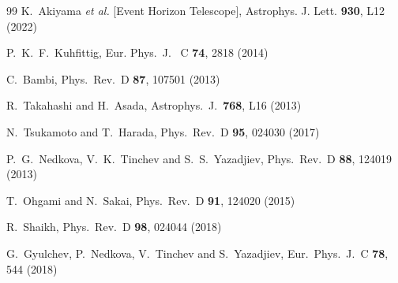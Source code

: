 \documentclass[aps,prd,12pt,superscriptaddress]{revtex4-2}
\begin{document}
\begin{thebibliography}{99}
K.~Akiyama \textit{et al.} [Event Horizon Telescope],
Astrophys. J. Lett. \textbf{930}, L12 (2022)


  P.~K.~F.~Kuhfittig,
  Eur. Phys.\ J. \ C {\bf 74}, 2818 (2014)
 
  C.~Bambi,
  Phys.\ Rev.\ D {\bf 87}, 107501 (2013)

  R.~Takahashi and H.~Asada,
  Astrophys.\ J.\  {\bf 768}, L16 (2013)

  N.~Tsukamoto and T.~Harada,
  Phys.\ Rev.\ D {\bf 95}, 024030 (2017)

  P.~G.~Nedkova, V.~K.~Tinchev and S.~S.~Yazadjiev,
  Phys.\ Rev.\ D {\bf 88}, 124019 (2013)

  T.~Ohgami and N.~Sakai,
  Phys.\ Rev.\ D {\bf 91}, 124020 (2015)

  R.~Shaikh,
  Phys.\ Rev.\ D {\bf 98}, 024044 (2018)

  G.~Gyulchev, P.~Nedkova, V.~Tinchev and S.~Yazadjiev,
  Eur.\ Phys.\ J.\ C {\bf 78}, 544 (2018)


\end{thebibliography}
\end{document}

